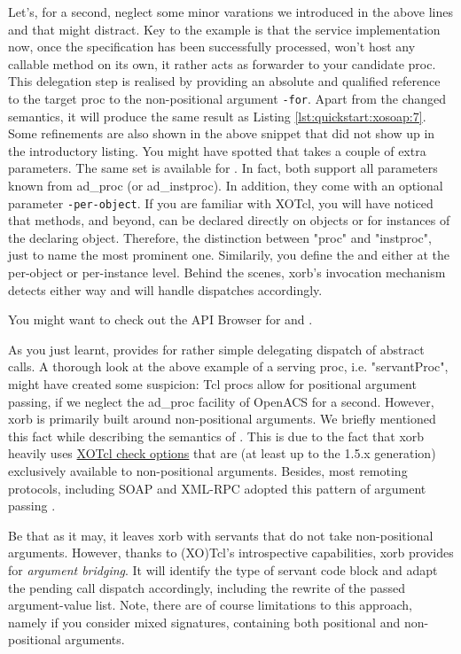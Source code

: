 Let's, for a second, neglect some minor varations we introduced in the
above lines and that might distract. Key to the example is that the
service implementation now, once the specification has been
successfully processed, won't host any callable method on its own, it
rather acts as forwarder to your candidate proc. This delegation step
is realised by providing an absolute and qualified reference to the
target proc to the non-positional argument \lstinline!-for!. Apart
from the changed semantics, it will produce the same result as Listing
\ref{lst:quickstart:xosoap:7}. Some refinements are also shown in the
above snippet that did not show up in the introductory listing.  You
might have spotted that  takes a couple of
extra parameters. The same set is available for
. In fact, both support all parameters known
from ad\_proc (or ad\_instproc). In addition, they come with an
optional parameter \lstinline!-per-object!. If you are familiar with
XOTcl, you will have noticed that methods, and beyond, can be declared
directly on objects or for instances of the declaring
object. Therefore, the distinction between "proc" and "instproc", just
to name the most prominent one. Similarily, you define the
 and  either at the
per-object or per-instance level. Behind the scenes, xorb's invocation
mechanism detects either way and will handle dispatches accordingly.
\begin{hints}
\item You might want to check out the API Browser for
   and .
\end{hints} 
As you just learnt,  provides
for rather simple delegating dispatch of abstract calls. A thorough
look at the above example of a serving proc, i.e. "servantProc", might
have created some suspicion: Tcl procs allow for positional argument
passing, if we neglect the ad\_proc facility of OpenACS for a
second. However, xorb is primarily built around non-positional
arguments. We briefly mentioned this fact while describing the
semantics of . This is due to the fact that
xorb heavily uses
\href{http://media.wu-wien.ac.at/doc/tutorial.html#non-pos-args}{XOTcl
  check options} that are (at least up to the 1.5.x generation)
exclusively available to non-positional arguments. Besides, most
remoting protocols, including SOAP and XML-RPC adopted this pattern of
argument passing \cite{zdun:2005b}.

Be that as it may, it leaves xorb with servants that do not take
non-positional arguments. However, thanks to (XO)Tcl's introspective
capabilities, xorb provides for \emph{argument bridging}. It will
identify the type of servant code block and adapt the pending call
dispatch accordingly, including the rewrite of the passed
argument-value list. Note, there are of course limitations to this
approach, namely if you consider mixed signatures, containing both
positional and non-positional arguments.


